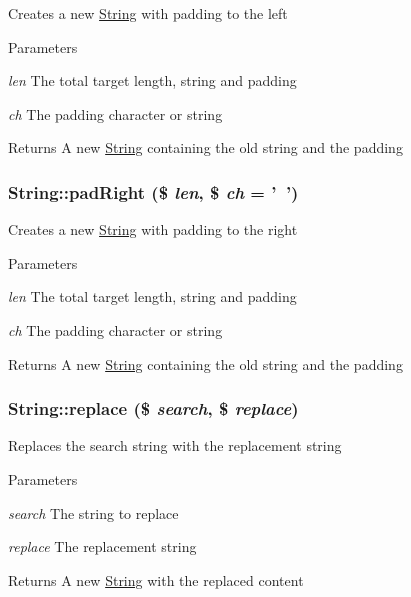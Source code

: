 \label{classString_ae39386e13e0e87cff555bfaea20ce656}
Creates a new \hyperlink{classString}{String} with padding to the left 
\begin{DoxyParams}{Parameters}
\item[{\em len}]The total target length, string and padding \item[{\em ch}]The padding character or string \end{DoxyParams}
\begin{DoxyReturn}{Returns}
A new \hyperlink{classString}{String} containing the old string and the padding 
\end{DoxyReturn}
\hypertarget{classString_a8ab0df0a7bbe4d99b84356403abf946f}{
\subsubsection[{padRight}]{\setlength{\rightskip}{0pt plus 5cm}String::padRight (\$ {\em len}, \/  \$ {\em ch} = {\ttfamily '~'})}}
\label{classString_a8ab0df0a7bbe4d99b84356403abf946f}
Creates a new \hyperlink{classString}{String} with padding to the right 
\begin{DoxyParams}{Parameters}
\item[{\em len}]The total target length, string and padding \item[{\em ch}]The padding character or string \end{DoxyParams}
\begin{DoxyReturn}{Returns}
A new \hyperlink{classString}{String} containing the old string and the padding 
\end{DoxyReturn}
\hypertarget{classString_adc4f1d6a5b06b6c610f89131e7b8e403}{
\subsubsection[{replace}]{\setlength{\rightskip}{0pt plus 5cm}String::replace (\$ {\em search}, \/  \$ {\em replace})}}
\label{classString_adc4f1d6a5b06b6c610f89131e7b8e403}
Replaces the search string with the replacement string 
\begin{DoxyParams}{Parameters}
\item[{\em search}]The string to replace \item[{\em replace}]The replacement string \end{DoxyParams}
\begin{DoxyReturn}{Returns}
A new \hyperlink{classString}{String} with the replaced content 
\end{DoxyReturn}
